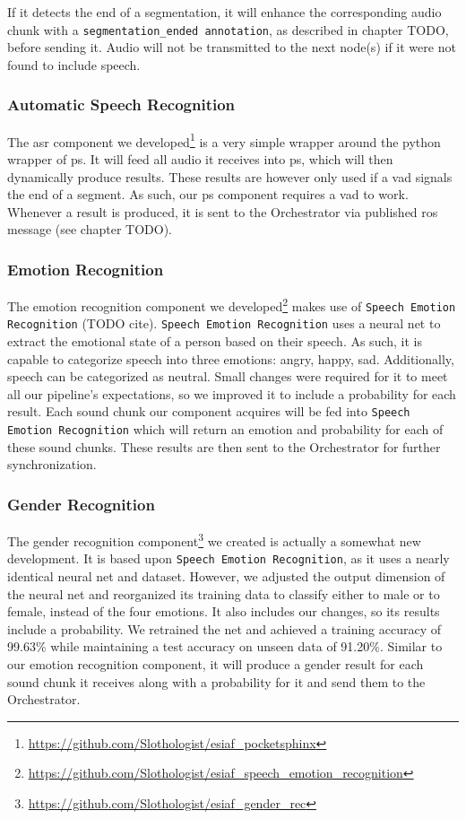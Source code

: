 If it detects the end of a segmentation, it will enhance the corresponding audio chunk with a \texttt{segmentation\_ended annotation}, as described in chapter TODO, before sending it.
Audio will not be transmitted to the next node(s) if it were not found to include speech.

\subsubsection{Automatic Speech Recognition}
\label{main:components:ps}
The \gls{asr} component we developed\footnote{\url{https://github.com/Slothologist/esiaf_pocketsphinx}} is a very simple wrapper around the python wrapper of \gls{ps}.
It will feed all audio it receives into \gls{ps}, which will then dynamically produce results.
These results are however only used if a \gls{vad} signals the end of a segment.
As such, our \gls{ps} component requires a \gls{vad} to work.
Whenever a result is produced, it is sent to the Orchestrator via published \gls{ros} message (see chapter TODO).

\subsubsection{Emotion Recognition}
\label{main:components:emotion}
The emotion recognition component we developed\footnote{\url{https://github.com/Slothologist/esiaf_speech_emotion_recognition}} makes use of \texttt{Speech Emotion Recognition} (TODO cite).
\texttt{Speech Emotion Recognition} uses a neural net to extract the emotional state of a person based on their speech.
As such, it is capable to categorize speech into three emotions: angry, happy, sad.
Additionally, speech can be categorized as neutral.
Small changes were required for it to meet all our pipeline's expectations, so we improved it to include a probability for each result. %
Each sound chunk our component acquires will be fed into \texttt{Speech Emotion Recognition} which will return an emotion and probability for each of these sound chunks.
These results are then sent to the Orchestrator for further synchronization.

\subsubsection{Gender Recognition}
\label{main:components:gender}
The gender recognition component\footnote{\url{https://github.com/Slothologist/esiaf_gender_rec}} we created is actually a somewhat new development.
It is based upon \texttt{Speech Emotion Recognition}, as it uses a nearly identical neural net and dataset.
However, we adjusted the output dimension of the neural net and reorganized its training data to classify either to male or to female, instead of the four emotions.
It also includes our changes, so its results include a probability.
We retrained the net and achieved a training accuracy of 99.63\% while maintaining a test accuracy on unseen data of 91.20\%.
Similar to our emotion recognition component, it will produce a gender result for each sound chunk it receives along with a probability for it and send them to the Orchestrator.


